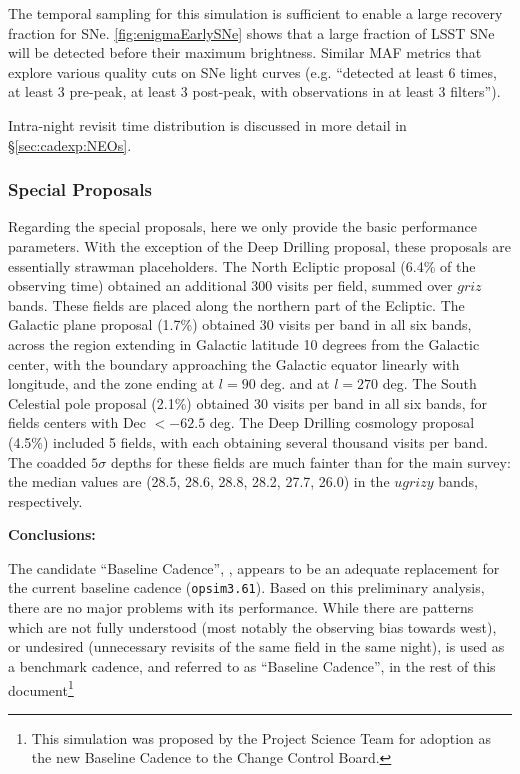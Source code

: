 The temporal sampling for this simulation is sufficient to enable a
large recovery fraction for SNe. \autoref{fig:enigmaEarlySNe} shows
that a large fraction of LSST SNe will be detected before their
maximum brightness. Similar MAF metrics that explore various quality
cuts on SNe light curves (e.g. ``detected at least 6 times, at least 3
pre-peak, at least 3 post-peak, with observations in at least 3
filters'').

Intra-night revisit time distribution is discussed in more detail in
\S\ref{sec:cadexp:NEOs}.


\subsubsection{Special Proposals}

Regarding the special proposals, here we only provide the basic
performance parameters. With the exception of the Deep Drilling
proposal, these proposals are essentially strawman placeholders. The
North Ecliptic proposal (6.4\% of the observing time) obtained an
additional 300 visits per field, summed over $griz$ bands. These
fields are placed along the northern part of the Ecliptic. The
Galactic plane proposal (1.7\%) obtained 30 visits per band in all six
bands, across the region extending in Galactic latitude 10 degrees
from the Galactic center, with the boundary approaching the Galactic
equator linearly with longitude, and the zone ending at $l=90$ deg.
and at $l=270$ deg. The South Celestial pole proposal (2.1\%) obtained
30 visits per band in all six bands, for fields centers with Dec $<
-62.5$ deg. The Deep Drilling cosmology proposal (4.5\%) included 5
fields, with each obtaining several thousand visits per band. The
coadded $5\sigma$ depths for these fields are much fainter than for
the main survey: the median values are (28.5, 28.6, 28.8, 28.2, 27.7,
26.0) in the $ugrizy$ bands, respectively.


\vskip 0.2in
{\bf Conclusions:}

The candidate “Baseline Cadence”, , appears to
be an adequate replacement for the current baseline cadence
(\texttt{opsim3.61}). Based on this preliminary analysis, there are no
major problems with its performance. While there are patterns which
are not fully understood (most notably the observing bias towards
west),  or undesired (unnecessary revisits of the same field in the
same night),  is used as a benchmark cadence,
and referred to as ``Baseline Cadence'',  in the rest of this
document\footnote{This simulation was proposed by the Project Science Team 
for adoption as the new Baseline Cadence to the Change Control Board.}


